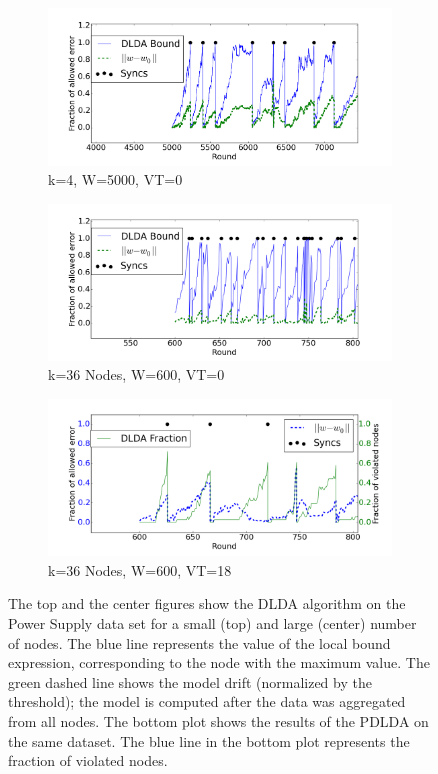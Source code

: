 \documentclass{vldb}
\begin{document}
\begin{figure}
    \centering
    \begin{subfigure}[b]{0.8\textwidth}
        \includegraphics[width=\textwidth]{graphics/4nodes.png}
        \caption{k=4, W=5000, VT=0}
    \end{subfigure}

    \begin{subfigure}[b]{0.8\textwidth}
        \includegraphics[width=\textwidth]{graphics/36nodes.png}
        \caption{k=36 Nodes, W=600, VT=0}
    \end{subfigure}

    \begin{subfigure}[b]{0.8\textwidth}
        \includegraphics[width=\textwidth]{graphics/36nodesProb.png}
        \caption{k=36 Nodes, W=600, VT=18}
    \end{subfigure}
    \caption{The top and the center figures show the DLDA algorithm on the Power Supply data set for a small (top) and large (center) number of nodes. The blue line represents the value of the local bound expression, corresponding to the node with the maximum value. The green dashed line shows the model drift (normalized by the threshold); the model is computed after the data was aggregated from all nodes. The bottom plot shows the results of the PDLDA on the same dataset. The blue line in the bottom plot represents the fraction of violated nodes.}\label{PowerSupplyFigures}
\end{figure}
\end{document}
